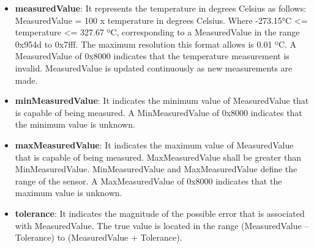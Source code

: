 \begin{itemize}
\item \textbf{measuredValue}: It represents the temperature in degrees Celsius as follows: MeasuredValue = 100 x temperature in degrees Celsius. Where -273.15°C <= temperature <= 327.67 ºC, corresponding to a MeasuredValue in the range 0x954d to 0x7fff. The maximum resolution this format allows is 0.01 ºC. A MeasuredValue of 0x8000 indicates that the temperature measurement is invalid. MeasuredValue is updated continuously as new measurements are made.
\item \textbf{minMeasuredValue}: It indicates the minimum value of MeasuredValue that is capable of being measured. A MinMeasuredValue of 0x8000 indicates that the minimum value is unknown.
\item \textbf{maxMeasuredValue}: It indicates the maximum value of MeasuredValue that is capable of being measured. MaxMeasuredValue shall be greater than MinMeasuredValue. MinMeasuredValue and MaxMeasuredValue define the range of the sensor. A MaxMeasuredValue of 0x8000 indicates that the maximum value is unknown.
\item \textbf{tolerance}: It indicates the magnitude of the possible error that is associated with MeasuredValue. The true value is located in the range (MeasuredValue – Tolerance) to (MeasuredValue + Tolerance).
\end{itemize}

